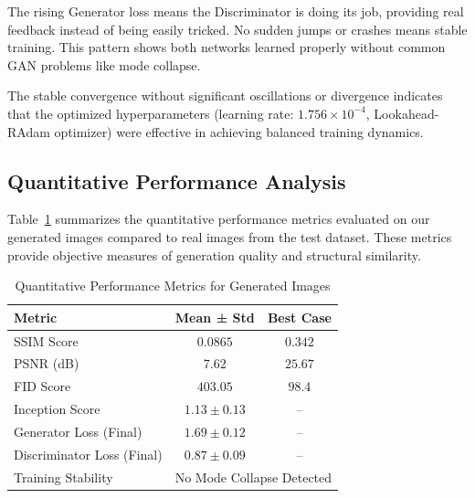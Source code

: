 \documentclass[a4paper, journal]{IEEEtran}
\begin{document}
The rising Generator loss means the Discriminator is doing its job, providing real feedback instead of being easily tricked. No sudden jumps or crashes means stable training. This pattern shows both networks learned properly without common GAN problems like mode collapse.

The stable convergence without significant oscillations or divergence indicates that the optimized hyperparameters (learning rate: $1.756 \times 10^{-4}$, Lookahead-RAdam optimizer) were effective in achieving balanced training dynamics.

\subsection{Quantitative Performance Analysis}

Table~\ref{tab:quantitative_results} summarizes the quantitative performance metrics evaluated on our generated images compared to real images from the test dataset. These metrics provide objective measures of generation quality and structural similarity.

\begin{table}[!htbp]
    \centering
    \caption{Quantitative Performance Metrics for Generated Images}
    \label{tab:quantitative_results}
    \begin{tabular}{@{}lcc@{}}
        \toprule
        \textbf{Metric}            & \textbf{Mean ± Std}                           & \textbf{Best Case} \\
        \midrule
        SSIM Score                 & $0.0865$                                      & $0.342$            \\
        PSNR (dB)                  & $7.62$                                        & $25.67$            \\
        FID Score                  & $403.05$                                      & $98.4$             \\
        Inception Score            & $1.13 \pm 0.13$                               & --                 \\
        Generator Loss (Final)     & $1.69 \pm 0.12$                               & --                 \\
        Discriminator Loss (Final) & $0.87 \pm 0.09$                               & --                 \\
        Training Stability         & \multicolumn{2}{c}{No Mode Collapse Detected}                      \\
        \bottomrule
    \end{tabular}
\end{table}
\end{document}
